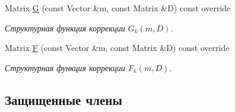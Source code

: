 \begin{DoxyCompactItemize}
Matrix \hyperlink{class_tasks_1_1_discrete_1_1_landing_linear_a290890c1d3a91803249a1f5d62bc658f}{G} (const Vector \&m, const Matrix \&D) const override
\begin{DoxyCompactList}\small\item\em Структурная функция коррекции $G_k(m, D)$. \end{DoxyCompactList}\item 
Matrix \hyperlink{class_tasks_1_1_discrete_1_1_landing_linear_abb4e2b054240cf909f0128721237334c}{F} (const Vector \&m, const Matrix \&D) const override
\begin{DoxyCompactList}\small\item\em Структурная функция коррекции $F_k(m, D)$. \end{DoxyCompactList}\end{DoxyCompactItemize}
\subsection*{Защищенные члены}
